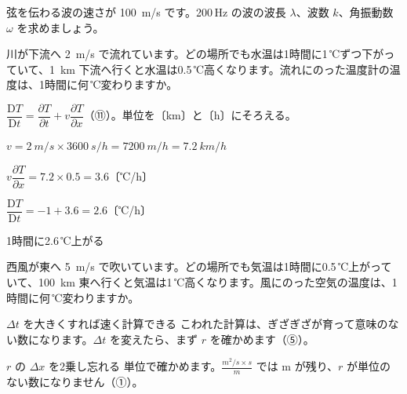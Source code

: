 \begin{jibun}
弦を伝わる波の速さが \qty{100}{m/s} です。200\,Hz の波の波長 $\lambda$、波数 $k$、角振動数 $\omega$ を求めましょう。
\end{jibun}

\begin{reidai}[流れにのった温度計]
川が下流へ \qty{2}{m/s} で流れています。どの場所でも水温は1時間に1\,℃ずつ下がっていて、\qty{1}{km} 下流へ行くと水温は0.5\,℃高くなります。流れにのった温度計の温度は、1時間に何\,℃変わりますか。\par
\kangaekata $\dfrac{\mathrm DT}{\mathrm Dt}=\dfrac{\partial T}{\partial t}+v\dfrac{\partial T}{\partial x}$（⑪）。単位を〔km〕と〔h〕にそろえる。\par
\shiki $v=\qty{2}{m/s}\times\qty{3600}{s/h}=\qty{7200}{m/h}=\qty{7.2}{km/h}$\par
\kviiinq $v\dfrac{\partial T}{\partial x}=7.2\times0.5=3.6$〔℃/h〕\par
\kviiinq $\dfrac{\mathrm DT}{\mathrm Dt}=-1+3.6=2.6$〔℃/h〕\par
\kotae 1時間に2.6\,℃上がる
\end{reidai}

\begin{jibun}
西風が東へ \qty{5}{m/s} で吹いています。どの場所でも気温は1時間に0.5\,℃上がっていて、\qty{100}{km} 東へ行くと気温は1\,℃高くなります。風にのった空気の温度は、1時間に何\,℃変わりますか。
\end{jibun}


\begin{tsumazuki}{$\Delta t$ を大きくすれば速く計算できる}
こわれた計算は、ぎざぎざが育って意味のない数になります。$\Delta t$ を変えたら、まず $r$ を確かめます（⑤）。
\end{tsumazuki}

\begin{tsumazuki}{$r$ の $\Delta x$ を2乗し忘れる}
単位で確かめます。$\frac{\unit{m^2/s}\times\unit{s}}{\unit{m}}$ では m が残り、$r$ が単位のない数になりません（①）。
\end{tsumazuki}

